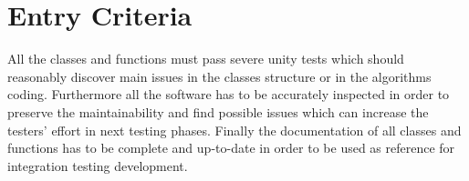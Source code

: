 \section{Entry Criteria}
\label{sec:entry-criteria}

All the classes and functions must pass severe unity tests which should reasonably discover main issues in the classes structure or in the algorithms coding. 
Furthermore all the software has to be accurately inspected in order to preserve the maintainability and find possible issues which can increase the testers' effort in next testing phases. 
Finally the documentation of all classes and functions has to be complete and up-to-date in order to be used as reference for integration testing development.
